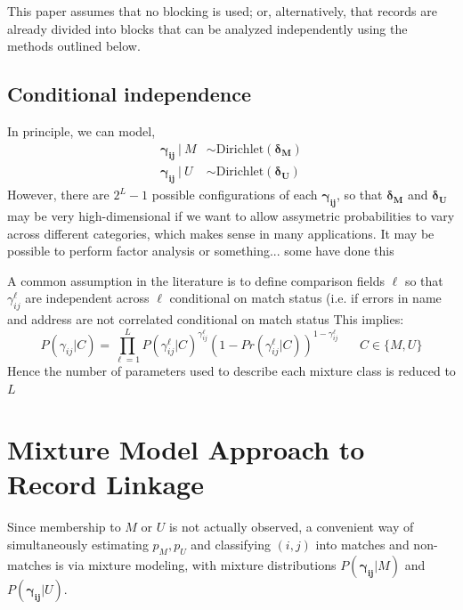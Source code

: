 \documentclass[11pt,reqno]{amsart}
\newcommand\gamij{\mathbf{\gamma_{ij}}}
\begin{document}
This paper assumes that no blocking is used; or, alternatively, that records are already divided into blocks that can be analyzed independently using the methods outlined below.  

\subsection{Conditional independence} In principle, we can model,
\begin{align*} \gamij\  |\  M &\sim \text{Dirichlet}(\mathbf{\delta_M})\\
\gamij\  |\  U &\sim \text{Dirichlet}(\mathbf{\delta_U}) \end{align*}
However, there are $2^{L}-1$ possible configurations of each $\gamij$, so that $\mathbf{\delta_M}$ and $\mathbf{\delta_U}$ may be very high-dimensional if we want to allow assymetric probabilities to vary across different categories, which makes sense in many applications.  It may be possible to perform factor analysis or something... some have done this

A common assumption in the literature is to define comparison fields $\ell$ so that $\gamma_{ij}^{\ell}$ are independent across $\ell$ conditional on match status (i.e. if errors in name and address are not correlated conditional on match status %
This implies:
 \begin{equation} 
 P(\gamma_{ij} | C) = \prod_{\ell=1}^L P(\gamma_{ij}^{\ell} | C)^{\gamma_{ij}^{\ell}}(1-Pr(\gamma_{ij}^{\ell} | C))^{1-\gamma_{ij}^{\ell}} \hspace{20pt} C\in \{M, U\} 
 \label{eq:condInd}
 \end{equation}
Hence the number of parameters used to describe each mixture class is reduced to $L$
 
 
 \section{Mixture Model Approach to Record Linkage}

 Since membership to $M$ or $U$ is not actually observed, a convenient way of simultaneously estimating $p_M, p_U$ and classifying $(i,j)$ into matches and non-matches is via mixture modeling, with mixture distributions $P(\gamij | M)$ and $P(\gamij | U)$.   %
 
\end{document}
